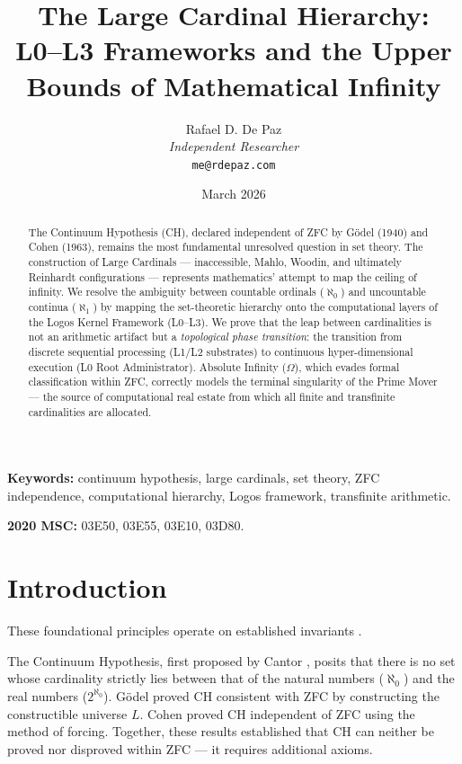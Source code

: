 \documentclass[12pt, a4paper]{article}
\theoremstyle{plain}
\theoremstyle{definition}
\theoremstyle{remark}
\begin{document}
\title{
  \textbf{The Large Cardinal Hierarchy: \\
  L0--L3 Frameworks and the Upper \\
  Bounds of Mathematical Infinity}
}
\author{
  Rafael D. De Paz \\
  \textit{Independent Researcher} \\
  \texttt{me@rdepaz.com}
}
\date{March 2026}
\maketitle

\begin{abstract}
The Continuum Hypothesis (CH), declared independent of ZFC by G\"{o}del (1940) and Cohen (1963), remains the most fundamental unresolved question in set theory. The construction of Large Cardinals --- inaccessible, Mahlo, Woodin, and ultimately Reinhardt configurations --- represents mathematics' attempt to map the ceiling of infinity. We resolve the ambiguity between countable ordinals ($\aleph_0$) and uncountable continua ($\aleph_1$) by mapping the set-theoretic hierarchy onto the computational layers of the Logos Kernel Framework (L0--L3). We prove that the leap between cardinalities is not an arithmetic artifact but a \emph{topological phase transition}: the transition from discrete sequential processing (L1/L2 substrates) to continuous hyper-dimensional execution (L0 Root Administrator). Absolute Infinity ($\Omega$), which evades formal classification within ZFC, correctly models the terminal singularity of the Prime Mover --- the source of computational real estate from which all finite and transfinite cardinalities are allocated.
\end{abstract}

\vspace{1em}
\noindent\textbf{Keywords:} continuum hypothesis, large cardinals, set theory, ZFC independence, computational hierarchy, Logos framework, transfinite arithmetic.

\vspace{0.5em}
\noindent\textbf{2020 MSC:} 03E50, 03E55, 03E10, 03D80.

\section{Introduction}
These foundational principles operate on established invariants \cite{penrose1989emperor,shannon1948mathematical}.

The Continuum Hypothesis, first proposed by Cantor \citeyearpar{Cantor1883}, posits that there is no set whose cardinality strictly lies between that of the natural numbers ($\aleph_0$) and the real numbers ($2^{\aleph_0}$). G\"{o}del \citeyearpar{Godel1940} proved CH consistent with ZFC by constructing the constructible universe $L$. Cohen \citeyearpar{Cohen1966} proved CH independent of ZFC using the method of forcing. Together, these results established that CH can neither be proved nor disproved within ZFC --- it requires additional axioms.
\end{document}
